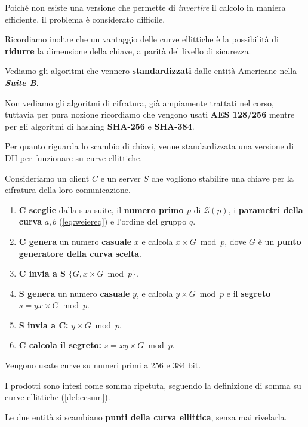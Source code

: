 Poiché non esiste una versione che permette di \textit{invertire} il calcolo in maniera efficiente, il problema è considerato difficile.\\
\begin{note}
Ricordiamo inoltre che un vantaggio delle curve ellittiche è la possibilità di \textbf{ridurre} la dimensione della chiave, a parità del livello di sicurezza.
\end{note}
Vediamo gli algoritmi che vennero \textbf{standardizzati} dalle entità Americane nella \textbf{\textit{Suite B}}.\\
\begin{remark}
Non vediamo gli algoritmi di cifratura, già ampiamente trattati nel corso, tuttavia per pura nozione ricordiamo che vengono usati \textbf{AES 128/256} mentre per gli algoritmi di hashing \textbf{SHA-256} e \textbf{SHA-384}.
\end{remark}
Per quanto riguarda lo scambio di chiavi, venne standardizzata una versione di DH per funzionare su curve ellittiche.
\begin{definition}\label{def:ecdh}
Consideriamo un client $C$ e un server $S$ che vogliono stabilire una chiave per la cifratura della loro comunicazione.
\begin{enumerate}
    \item \textbf{C sceglie} dalla sua suite, il \textbf{numero primo $p$} di $\mathcal{Z}(p)$, i \textbf{parametri della curva} $a,b$ (\cref{eq:weiereq}) e l'ordine del gruppo $q$.
    \item \textbf{C genera} un numero \textbf{casuale} $x$ e calcola $x\times G\bmod p$, dove $G$ è un \textbf{punto generatore della curva scelta}.
    \item \textbf{C invia a S} $\{G,x\times G\bmod p\}$.
    \item \textbf{S genera} un numero \textbf{casuale} $y$, e calcola $y\times G\bmod p$ e il \textbf{segreto} $s=yx\times G\bmod p$.
    \item \textbf{S invia a C:} $y\times G\bmod p$.
    \item \textbf{C calcola il segreto:} $s=xy\times G\bmod p$.
\end{enumerate}
Vengono usate curve su numeri primi a 256 e 384 bit.
\begin{remark}
I prodotti sono intesi come somma ripetuta, seguendo la definizione di somma su curve ellittiche (\cref{def:ecsum}).
\end{remark}
\begin{remark}
Le due entità si scambiano \textbf{punti della curva ellittica}, senza mai rivelarla.
\end{remark}
\end{definition}
